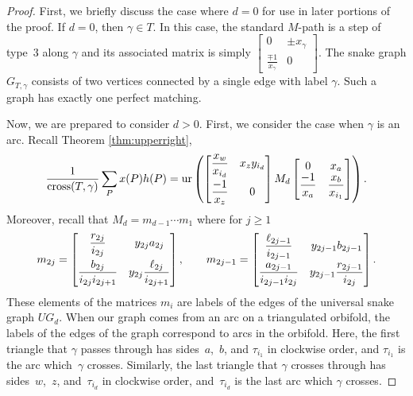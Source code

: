 \documentclass[pdftex]{sigma}%
\numberwithin{equation}{section}
\begin{document}
\begin{proof}First, we briefly discuss the case where $d=0$ for use in later portions of the proof. If $d = 0$, then $\gamma \in T$. In this case, the standard $M$-path is a step of type~3 along $\gamma$ and its associated matrix is simply $\left[\begin{smallmatrix} 0 & \pm x_\gamma \\ \frac{\mp 1}{x_\gamma} & 0 \end{smallmatrix}\right]$. The snake graph $G_{T,\gamma}$ consists of two vertices connected by a single edge with label $\gamma$. Such a graph has exactly one perfect matching.

Now, we are prepared to consider $d > 0$. First, we consider the case when $\gamma$ is an arc. Recall Theorem \ref{thm:upperright}, \[\frac{1}{{\rm cross}(T,\gamma)} \sum_P x(P) h(P)
=
{\rm ur} \left( \begin{bmatrix} \dfrac{x_w}{x_{i_d}} & x_z y_{i_d} \vspace{1mm}\\ \dfrac{-1}{x_z} & 0 \end{bmatrix} M_d \begin{bmatrix} 0 & x_a \\ \dfrac{-1}{x_a} & \dfrac{x_b}{x_{i_1}} \end{bmatrix}\right).\] Moreover, recall that $M_d = m_{d-1} \cdots m_1$ where for $j \geq 1$\[
m_{2j} = \begin{bmatrix}\dfrac{r_{2j}}{i_{2j}} & y_{2j} a_{2j} \vspace{1mm}\\ \dfrac{b_{2j}}{i_{2j}i_{2j+1}} & y_{2j} \dfrac{\ell_{2j}}{i_{2j+1}} \end{bmatrix}, \qquad m_{2j-1} = \begin{bmatrix} \dfrac{\ell_{2j-1}}{i_{2j-1}} & y_{2j-1} b_{2j-1} \vspace{1mm}\\ \dfrac{a_{2j-1}}{i_{2j-1}i_{2j}} & y_{2j-1} \dfrac{r_{2j-1}}{i_{2j}} \end{bmatrix}.
\] These elements of the matrices $m_i$ are labels of the edges of the universal snake graph $UG_d$. When our graph comes from an arc on a triangulated orbifold, the labels of the edges of the graph correspond to arcs in the orbifold. Here, the first triangle that $\gamma$ passes through has sides~$a$,~$b$, and $\tau_{i_1}$ in clockwise order, and $\tau_{i_1}$ is the arc which~$\gamma$ crosses. Similarly, the last triangle that $\gamma$ crosses through has sides~$w$,~$z$, and~$\tau_{i_d}$ in clockwise order, and~$\tau_{i_d}$ is the last arc which $\gamma$ crosses.


\end{proof}
\end{document}
